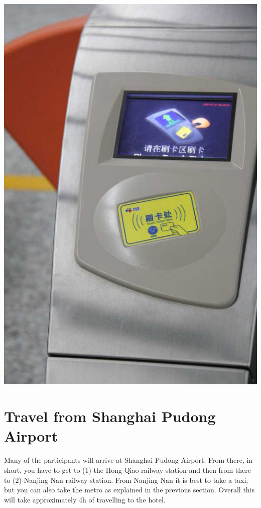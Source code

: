 \documentclass[11pt]{report}
\begin{document}
\begin{center}
\includegraphics[scale=0.27]{travel_guide/IMG_7177.jpg}
\end{center}


\section{Travel from Shanghai Pudong Airport}

Many of the participants will arrive at Shanghai Pudong
Airport. From there, in short, you have to get to (1) the Hong
Qiao railway station and then from there to (2) Nanjing Nan
railway station. From Nanjing Nan it is best to take a taxi,
but you can also take the metro as explained in the previous
section. Overall this will take approximately 4h of travelling
to the hotel. 
\end{document}
